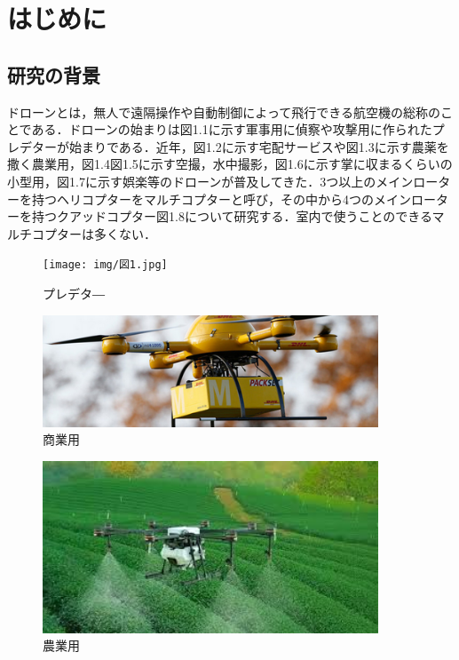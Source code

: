 \chapter{はじめに}

\section{研究の背景}
ドローンとは，無人で遠隔操作や自動制御によって飛行できる航空機の総称のことである．ドローンの始まりは図1.1に示す軍事用に偵察や攻撃用に作られたプレデターが始まりである．近年，図1.2に示す宅配サービスや図1.3に示す農薬を撒く農業用，図1.4図1.5に示す空撮，水中撮影，図1.6に示す掌に収まるくらいの小型用，図1.7に示す娯楽等のドローンが普及してきた．3つ以上のメインローターを持つヘリコプターをマルチコプターと呼び，その中から4つのメインローターを持つクアッドコプター図1.8について研究する．室内で使うことのできるマルチコプターは多くない．

\begin{figure}[htbp]
  \begin{center}
    \texttt{[image: img/図1.jpg]}
    \end{center}
  \caption{プレデタ―}
 \label{fig:robot}
\end{figure}

\begin{figure}[htbp]
  \begin{center}
    \includegraphics[width=100mm]{img/ドローンの商業利用.png}
    \end{center}
  \caption{商業用}
 \label{fig:robot}
\end{figure}

\begin{figure}[htbp]
  \begin{center}
    \includegraphics[width=100mm]{img/images.jpg}
    \end{center}
  \caption{農業用}
 \label{fig:robot}
\end{figure}

